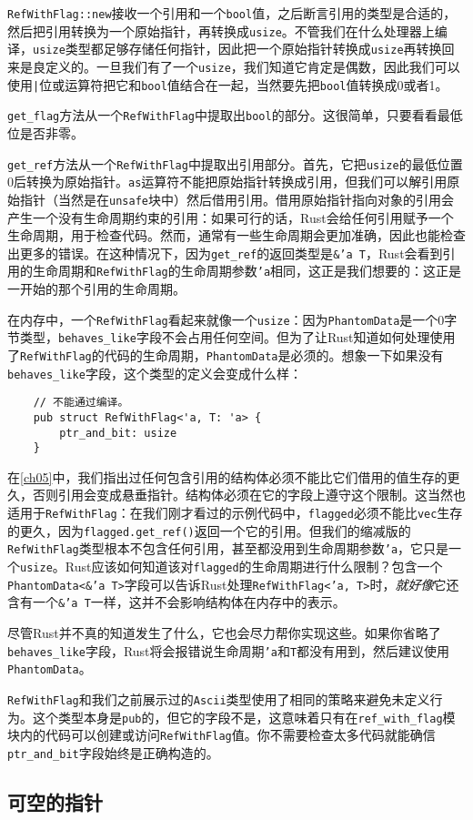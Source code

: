 \texttt{RefWithFlag::new}接收一个引用和一个\texttt{bool}值，之后断言引用的类型是合适的，然后把引用转换为一个原始指针，再转换成\texttt{usize}。不管我们在什么处理器上编译，\texttt{usize}类型都足够存储任何指针，因此把一个原始指针转换成\texttt{usize}再转换回来是良定义的。一旦我们有了一个\texttt{usize}，我们知道它肯定是偶数，因此我们可以使用\texttt{|}位或运算符把它和\texttt{bool}值结合在一起，当然要先把\texttt{bool}值转换成0或者1。

\texttt{get\_flag}方法从一个\texttt{RefWithFlag}中提取出\texttt{bool}的部分。这很简单，只要看看最低位是否非零。

\texttt{get\_ref}方法从一个\texttt{RefWithFlag}中提取出引用部分。首先，它把\texttt{usize}的最低位置0后转换为原始指针。\texttt{as}运算符不能把原始指针转换成引用，但我们可以解引用原始指针（当然是在\texttt{unsafe}块中）然后借用引用。借用原始指针指向对象的引用会产生一个没有生命周期约束的引用：如果可行的话，Rust会给任何引用赋予一个生命周期，用于检查代码。然而，通常有一些生命周期会更加准确，因此也能检查出更多的错误。在这种情况下，因为\texttt{get\_ref}的返回类型是\texttt{\&'a T}，Rust会看到引用的生命周期和\texttt{RefWithFlag}的生命周期参数\texttt{'a}相同，这正是我们想要的：这正是一开始的那个引用的生命周期。

在内存中，一个\texttt{RefWithFlag}看起来就像一个\texttt{usize}：因为\texttt{PhantomData}是一个0字节类型，\texttt{behaves\_like}字段不会占用任何空间。但为了让Rust知道如何处理使用了\texttt{RefWithFlag}的代码的生命周期，\texttt{PhantomData}是必须的。想象一下如果没有\texttt{behaves\_like}字段，这个类型的定义会变成什么样：
\begin{verbatim}
    // 不能通过编译。
    pub struct RefWithFlag<'a, T: 'a> {
        ptr_and_bit: usize
    }
\end{verbatim}

在\autoref{ch05}中，我们指出过任何包含引用的结构体必须不能比它们借用的值生存的更久，否则引用会变成悬垂指针。结构体必须在它的字段上遵守这个限制。这当然也适用于\texttt{RefWithFlag}：在我们刚才看过的示例代码中，\texttt{flagged}必须不能比\texttt{vec}生存的更久，因为\texttt{flagged.get\_ref()}返回一个它的引用。但我们的缩减版的\texttt{RefWithFlag}类型根本不包含任何引用，甚至都没用到生命周期参数\texttt{'a}，它只是一个\texttt{usize}。Rust应该如何知道该对\texttt{flagged}的生命周期进行什么限制？包含一个\texttt{PhantomData<\&'a T>}字段可以告诉Rust处理\texttt{RefWithFlag<'a, T>}时，\emph{就好像}它还含有一个\texttt{\&'a T}一样，这并不会影响结构体在内存中的表示。

尽管Rust并不真的知道发生了什么，它也会尽力帮你实现这些。如果你省略了\texttt{behaves\_like}字段，Rust将会报错说生命周期\texttt{'a}和\texttt{T}都没有用到，然后建议使用\texttt{PhantomData}。

\texttt{RefWithFlag}和我们之前展示过的\texttt{Ascii}类型使用了相同的策略来避免未定义行为。这个类型本身是\texttt{pub}的，但它的字段不是，这意味着只有在\texttt{ref\_with\_flag}模块内的代码可以创建或访问\texttt{RefWithFlag}值。你不需要检查太多代码就能确信\texttt{ptr\_and\_bit}字段始终是正确构造的。

\subsection{可空的指针}


